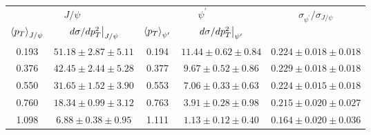 \begin{tabular}{cc|cc|c}
\hline
\multicolumn{2}{c|}{$J/\psi$}                                 & \multicolumn{2}{c|}{$\psi^{\prime}$}                                 & \multirow{2}{*}{$\sigma_{\psi^\prime}/\sigma_{J/\psi}$} \\ \cline{1-4}
$\expval{p_T}_{J/\psi}$    & $\eval{d\sigma/dp^2_T}_{J/\psi}$ & $\expval{p_T}_{\psi^\prime}$ & $\eval{d\sigma/dp^2_T}_{\psi^\prime}$ &                                                         \\ \hline
\multicolumn{1}{c|}{0.193} & $51.18\pm2.87\pm5.11$            & \multicolumn{1}{c|}{0.194}   & $11.44\pm0.62\pm0.84$                 & $0.224\pm0.018\pm0.018$                                 \\
\multicolumn{1}{c|}{0.376} & $42.45\pm2.44\pm5.28$            & \multicolumn{1}{c|}{0.377}   & $9.67\pm0.52\pm0.86$                  & $0.229\pm0.018\pm0.018$                                 \\
\multicolumn{1}{c|}{0.550} & $31.65\pm1.52\pm3.90$            & \multicolumn{1}{c|}{0.553}   & $7.06\pm0.33\pm0.63$                  & $0.224\pm0.015\pm0.018$                                 \\
\multicolumn{1}{c|}{0.760} & $18.34\pm0.99\pm3.12$            & \multicolumn{1}{c|}{0.763}   & $3.91\pm0.28\pm0.98$                  & $0.215\pm0.020\pm0.027$                                 \\
\multicolumn{1}{c|}{1.098} & $6.88\pm0.38\pm0.95$             & \multicolumn{1}{c|}{1.111}   & $1.13\pm0.12\pm0.40$                  & $0.164\pm0.020\pm0.036$                                 \\ \hline
\end{tabular}
